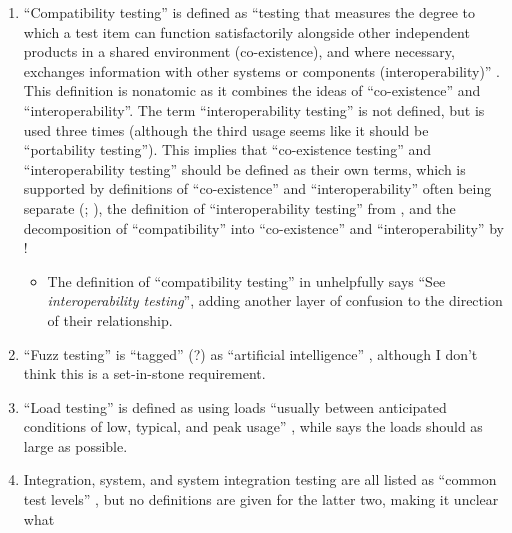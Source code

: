 \begin{enumerate}
      \item ``Compatibility testing'' is defined as ``testing that measures the
            degree to which a test item can function satisfactorily alongside
            other independent products in a shared environment (co-existence),
            and where necessary, exchanges information with other systems or
            components (interoperability)'' \citep[p.~3]{IEEE2022}. This
            definition is nonatomic as it combines the ideas of ``co-existence''
            and ``interoperability''. The term ``interoperability testing'' is
            not defined, but is used three times \citep[pp.~22,~43]{IEEE2022}
            (although the third usage seems like it should be ``portability
            testing''). This implies that ``co-existence testing'' and
            ``interoperability testing'' should be defined as their own terms,
            which is supported by definitions of ``co-existence'' and
            ``interoperability'' often being separate (;
            \citealp[pp.~73,~237]{IEEE2017}), the definition of
            ``interoperability testing'' from \citet[p.~238]{IEEE2017},
            and the decomposition of ``compatibility'' into ``co-existence''
            and ``interoperability'' by \citet{ISO_IEC2023a}!
            \begin{itemize}
                  \item The definition of ``compatibility testing'' in
                        \citep[p.~43]{Kam2008} unhelpfully says ``See
                        \emph{interoperability testing}'', adding another
                        layer of confusion to the direction of their
                        relationship.
            \end{itemize}
      \item ``Fuzz testing'' is ``tagged'' (?) as ``artificial intelligence''
            \citep[p.~5]{IEEE2022}, although I don't think this is a
            set-in-stone requirement.
      \item ``Load testing'' is defined as using loads ``usually between
            anticipated conditions of low, typical, and peak usage''
            \citep[p.~5]{IEEE2022}, while \citet[p.~86]{Patton2006} says the
            loads should as large as possible.
      \item Integration, system, and system integration testing are all listed
            as ``common test levels'' \citep[p.~12]{IEEE2022}, but no
            definitions are given for the latter two, making it unclear what

\end{enumerate}

